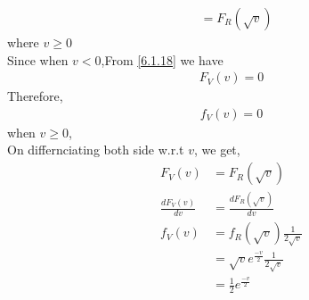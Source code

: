 \documentclass[journal,12pt,twocolumn]{IEEEtran}
\renewcommand\thesection{\arabic{section}}
\begin{document}
\begin{enumerate}[label=\thesection.\arabic*.,ref=\thesection.\theenumi]
\begin{align}
    &=F_R(\sqrt{v}) \label{6.1.18}
\end{align}
where $v \geq 0$\\
Since when $v< 0$,From \eqref{6.1.18} we have 
\begin{align}F_V(v) = 0\end{align}
Therefore,\begin{align}
    f_V(v) = 0
\end{align}
when $v \geq 0$, \\
On differnciating both side w.r.t $v$, we get,
\begin{align}
    F_V(v) &= F_R(\sqrt{v})\\
    \frac{dF_V(v)}{dv} &= \frac{dF_R(\sqrt{v})}{dv} \\
    f_V(v) &= f_R(\sqrt{v})\frac{1}{2\sqrt{v}} \\
    &=\sqrt{v}e^{\frac{-v}{2}}\frac{1}{2\sqrt{v}}\\
    &=\frac{1}{2}e^{\frac{-v}{2}}
\end{align}


\end{enumerate}
\end{document}
